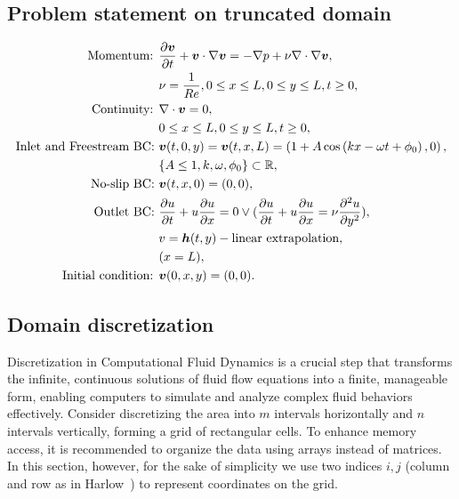\documentclass{article}
\begin{document}
\subsection{Problem statement on truncated domain}
\begin{subequations}
\label{eqs:NSE-dsm-bl}
\begin{align}
\label{eqn:momentum}
\text{Momentum: }	&\frac{\partial \boldsymbol{v}}{\partial t} + \boldsymbol{v} \cdot \nabla \boldsymbol{v} = -\nabla p + \nu \nabla \cdot \nabla \boldsymbol{v}, \\ 
					&\nu = \frac{1}{Re},0\leq x \leq L, 0\leq y \leq L, t\geq0,\notag\\
\label{eqn:continuity-dsm-bl}
\text{Continuity: }	& \nabla \cdot \boldsymbol{v} = 0, \\ 
					&0\leq x \leq L, 0\leq y \leq L, t\geq0, \notag\\
\label{eqn:NSE-dsm-bl-bc-freestream}
\text{Inlet and Freestream BC: } 	& \boldsymbol{v}(t,0,y)=\boldsymbol{v}(t,x,L)=\left(1 + A\cos\left( kx -\omega t + \phi_0 \right),0\right),\\
									& \{A\leq 1,k,\omega, \phi_0\}\subset \mathbb{R},\notag\\
\label{eqn:NSE-dsm-bl-bc-noslip}
\text{No-slip BC: } & \boldsymbol{v}(t,x,0)=(0,0), \\
\label{eqn:NSE-dsm-bl-bc-outlet}
\text{Outlet BC: } 	& \frac{\partial u}{\partial t}+u\frac{\partial u}{\partial x}=0\lor(\frac{\partial u}{\partial t}+u\frac{\partial u}{\partial x}=\nu \frac{\partial ^2 u}{\partial y^2}), \\ 
					& v=\boldsymbol{h}(t,y)-\text{linear extrapolation},\notag\\
					& (x=L),\notag\\
\text{Initial condition: } &\boldsymbol{v}(0,x,y)=(0,0).
\end{align}
\end{subequations}

\subsection{Domain discretization}\label{subsec:dsm-domain}
Discretization in Computational Fluid Dynamics is a crucial step that transforms the infinite, continuous solutions of fluid flow equations into a finite, manageable form, enabling computers to simulate and analyze complex fluid behaviors effectively. Consider discretizing the area into $m$ intervals horizontally and $n$ intervals vertically, forming a grid of rectangular cells. To enhance memory access, it is recommended to organize the data using arrays instead of matrices. In this section, however, for the sake of simplicity we use two indices $i,j$ (column and row as in Harlow~\cite{Harlow:1965}) to represent coordinates on the grid.
\end{document}
